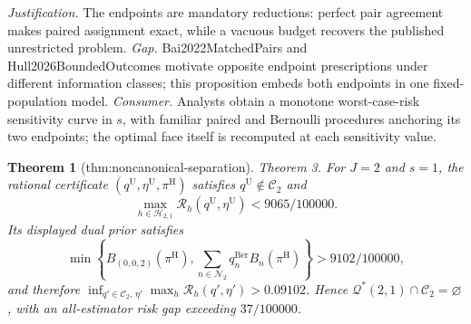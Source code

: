 \documentclass{article}
\newtheorem{theorem}{Theorem}
\begin{document}
\par\smallskip\noindent \textit{Justification.} The endpoints are mandatory reductions: perfect pair agreement makes paired assignment exact, while a vacuous budget recovers the published unrestricted problem. \textit{Gap.} Bai2022MatchedPairs and Hull2026BoundedOutcomes motivate opposite endpoint prescriptions under different information classes; this proposition embeds both endpoints in one fixed-population model. \textit{Consumer.} Analysts obtain a monotone worst-case-risk sensitivity curve in \(s\), with familiar paired and Bernoulli procedures anchoring its two endpoints; the optimal face itself is recomputed at each sensitivity value.

\begin{theorem}[thm:noncanonical-separation]\label{thm:noncanonical-separation}
Theorem 3. For \(J=2\) and \(s=1\), the rational certificate \((q^{\mathrm U},\eta^{\mathrm U},\pi^{\mathrm H})\) satisfies \(q^{\mathrm U}\notin\mathcal C_2\) and \[\max_{h\in\mathcal H_{2,1}}\mathcal R_h(q^{\mathrm U},\eta^{\mathrm U})<9065/100000.\] Its displayed dual prior satisfies \[\min\left\{B_{(0,0,2)}(\pi^{\mathrm H}),\sum_{n\in\mathcal N_2}q^{\mathrm{Ber}}_nB_n(\pi^{\mathrm H})\right\}>9102/100000,\] and therefore \(\inf_{q'\in\mathcal C_2,\,\eta'}\max_h\mathcal R_h(q',\eta')>0.09102\). Hence \(\mathcal Q^*(2,1)\cap\mathcal C_2=\varnothing\), with an all-estimator risk gap exceeding \(37/100000\).
\end{theorem}
\end{document}
